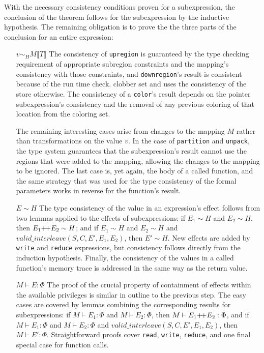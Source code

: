 With the necessary consistency conditions proven for a subexpression, the conclusion of the theorem follows for
the subexpression by the inductive hypothesis.  The remaining obligation is to prove the the three parts of the
conclusion for an entire expression:
\begin{itemize}

\item[$v \sim_H M \llbracket T \rrbracket$]    The consistency of 
{\tt upregion} is guaranteed by the type checking requirement of appropriate subregion
constraints and the mapping's consistency with those constraints, and {\tt downregion}'s
result is consistent because of the run time check.  
clobber set and uses the consistency of the store otherwise.  The consistency of a 
{\tt color}'s result depends on the pointer subexpression's consistency and the 
removal of any previous coloring of that location from the coloring set.  

The remaining interesting cases arise from changes to the mapping $M$ rather than transformations on the
value $v$.  In the case of {\tt partition} and {\tt unpack}, the type system
guarantees that the subexpression's result cannot use the regions that were added to the
mapping, allowing the changes to the mapping to be ignored.  The last case is, yet again, the body
of a called function, and the same strategy that was used for the type consistency of the
formal parameters works in reverse for the function's result.

\item[$E \sim H$] The type consistency of the value in an expression's effect follows from two lemmas applied to the effects
of subexpressions:
if $E_1 \sim H$ and $E_2 \sim H$, then $E_1 \text{+\!+} E_2 \sim H$; and 
if $E_1 \sim H$ and $E_2 \sim H$ and $valid\_interleave(S, C, E', E_1, E_2)$, then $E' \sim H$.
New effects are added by {\tt write} and {\tt reduce} expressions, but consistency follows
directly from the induction hypothesis.  Finally, the consistency of the
values in a called function's memory trace is addressed in the same way as the return value.

\item[$M \vdash E : \Phi$] The proof of the crucial property of containment of effects within the available privileges
is similar in outline to the previous step.  The easy cases are covered by lemmas combining the corresponding results
for subexpressions: if $M \vdash E_1 : \Phi$ and $M \vdash E_2 : \Phi$, then $M \vdash E_1 \text{+\!+} E_2 : \Phi$, and
if $M \vdash E_1 : \Phi$ and $M \vdash E_2 : \Phi$ and $valid\_interleave(S, C, E', E_1, E_2)$, then $M \vdash E' : \Phi$.
Straightforward proofs cover {\tt read}, {\tt write}, {\tt reduce}, and one final special case for function calls. 
\end{itemize}

